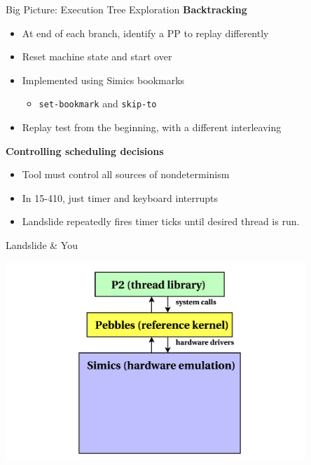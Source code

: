 \documentclass[xcolor=dvipsnames]{beamer}
\begin{document}
\begin{frame}{Big Picture: Execution Tree Exploration}
	\textbf{Backtracking}
	\begin{itemize}
		\item At end of each branch, identify a PP to replay differently
		\item Reset machine state and start over
		\item Implemented using Simics bookmarks
			\begin{itemize}
				\item {\tt set-bookmark} and {\tt skip-to}
			\end{itemize}
		\item Replay test from the beginning, with a different interleaving
	\end{itemize}
	\pause
	\linegap

	{\bf Controlling scheduling decisions}
	\begin{itemize}
		\item Tool must control all sources of nondeterminism
		\item In 15-410, just timer and keyboard interrupts
		\item Landslide repeatedly fires timer ticks until desired thread is run.
	\end{itemize}
\end{frame}

\begin{frame}{Landslide \& You}
	\begin{center}
	\includegraphics[width=0.85\textwidth]{landslide-new-blank.pdf}
	\end{center}
\end{frame}
\end{document}
